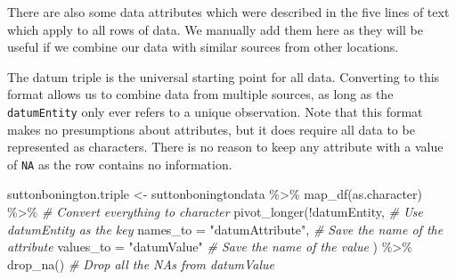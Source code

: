 \documentclass{article}
\newenvironment{Shaded}{\begin{snugshade}}{\end{snugshade}}
\newcommand{\AttributeTok}[1]{\textcolor[rgb]{0.77,0.63,0.00}{#1}}
\newcommand{\CommentTok}[1]{\textcolor[rgb]{0.56,0.35,0.01}{\textit{#1}}}
\newcommand{\DecValTok}[1]{\textcolor[rgb]{0.00,0.00,0.81}{#1}}
\newcommand{\FloatTok}[1]{\textcolor[rgb]{0.00,0.00,0.81}{#1}}
\newcommand{\FunctionTok}[1]{\textcolor[rgb]{0.00,0.00,0.00}{#1}}
\newcommand{\NormalTok}[1]{#1}
\newcommand{\OtherTok}[1]{\textcolor[rgb]{0.56,0.35,0.01}{#1}}
\newcommand{\SpecialCharTok}[1]{\textcolor[rgb]{0.00,0.00,0.00}{#1}}
\newcommand{\StringTok}[1]{\textcolor[rgb]{0.31,0.60,0.02}{#1}}
\begin{document}
There are also some data attributes which were described in the five lines of text which apply to all rows of data. We manually add them here as they will be useful if we combine our data with similar sources from other locations.

\begin{Shaded}
\end{Shaded}

The datum triple is the universal starting point for all data. Converting to this format allows us to combine data from multiple sources, as long as the \texttt{datumEntity} only ever refers to a unique observation. Note that this format makes no presumptions about attributes, but it does require all data to be represented as characters. There is no reason to keep any attribute with a value of \texttt{NA} as the row contains no information.

\begin{Shaded}
\begin{Highlighting}[]
\NormalTok{suttonbonington.triple }\OtherTok{\textless{}{-}}\NormalTok{ suttonboningtondata }\SpecialCharTok{\%\textgreater{}\%} 
                  \FunctionTok{map\_df}\NormalTok{(as.character) }\SpecialCharTok{\%\textgreater{}\%} \CommentTok{\# Convert everything to character}
                  \FunctionTok{pivot\_longer}\NormalTok{(}\SpecialCharTok{!}\NormalTok{datumEntity, }\CommentTok{\# Use datumEntity as the key}
                  \AttributeTok{names\_to =} \StringTok{"datumAttribute"}\NormalTok{, }\CommentTok{\# Save the name of the attribute}
                  \AttributeTok{values\_to =} \StringTok{"datumValue"} \CommentTok{\# Save the name of the value}
\NormalTok{                  ) }\SpecialCharTok{\%\textgreater{}\%} 
                  \FunctionTok{drop\_na}\NormalTok{() }\CommentTok{\# Drop all the NAs from datumValue}
\end{Highlighting}
\end{Shaded}
\end{document}
